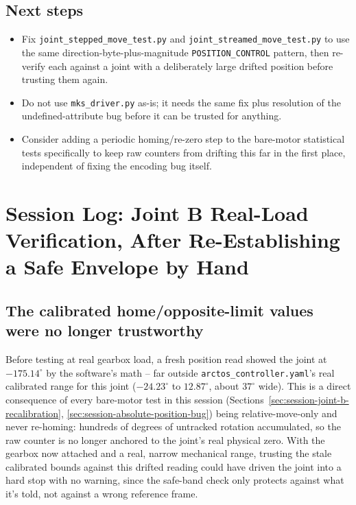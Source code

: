 \documentclass[11pt,letterpaper]{article}
\begin{document}
\subsection{Next steps}
\begin{itemize}
    \item Fix \texttt{joint\_stepped\_move\_test.py} and \texttt{joint\_streamed\_move\_test.py} to use the same direction-byte-plus-magnitude \texttt{POSITION\_CONTROL} pattern, then re-verify each against a joint with a deliberately large drifted position before trusting them again.
    \item Do not use \texttt{mks\_driver.py} as-is; it needs the same fix plus resolution of the undefined-attribute bug before it can be trusted for anything.
    \item Consider adding a periodic homing/re-zero step to the bare-motor statistical tests specifically to keep raw counters from drifting this far in the first place, independent of fixing the encoding bug itself.
\end{itemize}

\section{Session Log: Joint B Real-Load Verification, After Re-Establishing a Safe Envelope by Hand}
\label{sec:session-joint-b-real-load}

\subsection{The calibrated home/opposite-limit values were no longer trustworthy}
Before testing at real gearbox load, a fresh position read showed the joint at $-175.14^\circ$ by the software's math -- far outside \texttt{arctos\_controller.yaml}'s real calibrated range for this joint ($-24.23^\circ$ to $12.87^\circ$, about $37^\circ$ wide). This is a direct consequence of every bare-motor test in this session (Sections~\ref{sec:session-joint-b-recalibration}, \ref{sec:session-absolute-position-bug}) being relative-move-only and never re-homing: hundreds of degrees of untracked rotation accumulated, so the raw counter is no longer anchored to the joint's real physical zero. With the gearbox now attached and a real, narrow mechanical range, trusting the stale calibrated bounds against this drifted reading could have driven the joint into a hard stop with no warning, since the safe-band check only protects against what it's told, not against a wrong reference frame.
\end{document}
